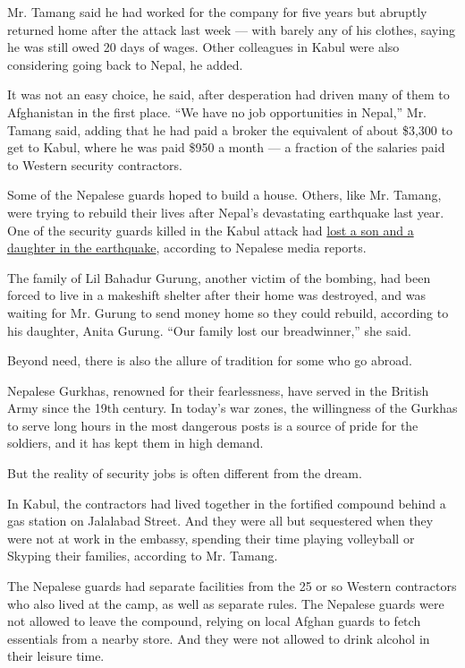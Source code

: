 Mr. Tamang said he had worked for the company for five years but
abruptly returned home after the attack last week --- with barely any of
his clothes, saying he was still owed 20 days of wages. Other colleagues
in Kabul were also considering going back to Nepal, he added.

It was not an easy choice, he said, after desperation had driven many of
them to Afghanistan in the first place. ``We have no job opportunities
in Nepal,'' Mr. Tamang said, adding that he had paid a broker the
equivalent of about \$3,300 to get to Kabul, where he was paid \$950 a
month --- a fraction of the salaries paid to Western security
contractors.

Some of the Nepalese guards hoped to build a house. Others, like Mr.
Tamang, were trying to rebuild their lives after Nepal's devastating
earthquake last year. One of the security guards killed in the Kabul
attack had
\href{http://www.nepalitimes.com/blogs/thebrief/2016/06/23/lives-of-our-brothers/}{lost
a son and a daughter in the earthquake}, according to Nepalese media
reports.

The family of Lil Bahadur Gurung, another victim of the bombing, had
been forced to live in a makeshift shelter after their home was
destroyed, and was waiting for Mr. Gurung to send money home so they
could rebuild, according to his daughter, Anita Gurung. ``Our family
lost our breadwinner,'' she said.

Beyond need, there is also the allure of tradition for some who go
abroad.

Nepalese Gurkhas, renowned for their fearlessness, have served in the
British Army since the 19th century. In today's war zones, the
willingness of the Gurkhas to serve long hours in the most dangerous
posts is a source of pride for the soldiers, and it has kept them in
high demand.

But the reality of security jobs is often different from the dream.

In Kabul, the contractors had lived together in the fortified compound
behind a gas station on Jalalabad Street. And they were all but
sequestered when they were not at work in the embassy, spending their
time playing volleyball or Skyping their families, according to Mr.
Tamang.

The Nepalese guards had separate facilities from the 25 or so Western
contractors who also lived at the camp, as well as separate rules. The
Nepalese guards were not allowed to leave the compound, relying on local
Afghan guards to fetch essentials from a nearby store. And they were not
allowed to drink alcohol in their leisure time.

